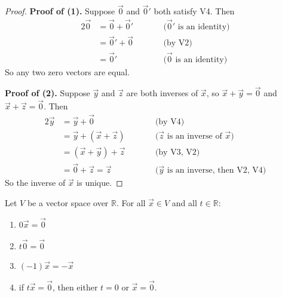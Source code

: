 \begin{proof}
\textbf{Proof of (1).} Suppose $\vec{0}$ and $\vec{0}'$ both satisfy V4. Then
\begin{alignat*}{2}
\vec{0} &= \vec{0} + \vec{0}'  &\qquad& \text{($\vec{0}'$ is an identity)} \\
        &= \vec{0}' + \vec{0}  &&       \text{(by V2)} \\
        &= \vec{0}'            &&       \text{($\vec{0}$ is an identity)}
\end{alignat*}
So any two zero vectors are equal.

\medskip
\textbf{Proof of (2).} Suppose $\vec{y}$ and $\vec{z}$ are both inverses of $\vec{x}$, so $\vec{x} + \vec{y} = \vec{0}$ and $\vec{x} + \vec{z} = \vec{0}$. Then
\begin{alignat*}{2}
\vec{y} &= \vec{y} + \vec{0}                &\qquad& \text{(by V4)} \\
        &= \vec{y} + (\vec{x} + \vec{z})    &&       \text{($\vec{z}$ is an inverse of $\vec{x}$)} \\
        &= (\vec{x} + \vec{y}) + \vec{z}    &&       \text{(by V3, V2)} \\
        &= \vec{0} + \vec{z} = \vec{z}      &&       \text{($\vec{y}$ is an inverse, then V2, V4)}
\end{alignat*}
So the inverse of $\vec{x}$ is unique.
\end{proof}

\begin{theorem}\label{thm:L1-arith}
Let $V$ be a vector space over $\mathbb{R}$. For all $\vec{x} \in V$ and all $t \in \mathbb{R}$:
\begin{enumerate}
    \item $0\vec{x} = \vec{0}$
    \item $t\vec{0} = \vec{0}$
    \item $(-1)\vec{x} = -\vec{x}$
    \item if $t\vec{x} = \vec{0}$, then either $t = 0$ or $\vec{x} = \vec{0}$.
\end{enumerate}
\end{theorem}

